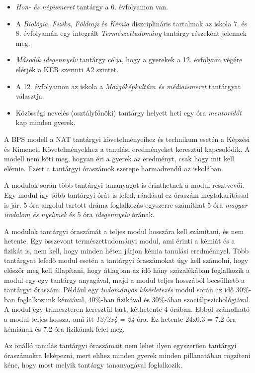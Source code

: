\begin{itemize}
\tightlist
\item
  \emph{Hon- és népismeret} tantárgy a 6. évfolyamon van.
\item
  A \emph{Biológia}, \emph{Fizika}, \emph{Földrajz} és \emph{Kémia}
  diszciplináris tartalmak az iskola 7. és 8. évfolyamán egy integrált
  \emph{Természettudomány} tantárgy részeként jelennek meg.
\item
  \emph{Második idegennyelv} tantárgy célja, hogy a gyerekek a 12.
  évfolyam végére elérjék a KER szerinti A2 szintet.
\item
  A 12. évfolyamon az iskola a \emph{Mozgóképkultúra és médiaismeret}
  tantárgyat választja.
\item
  Közösségi nevelés (osztályfőnöki) tantárgy helyett heti egy óra
  \emph{mentoridőt} kap minden gyerek.
\end{itemize}

A BPS modell a NAT tantárgyi követelményeihez és technikum esetén a
Képzési és Kimeneti Követelményekhez a tanulási eredményeket keresztül
kapcsolódik. A modell nem köti meg, hogyan éri a gyerek az eredményt,
csak hogy mit kell elérnie. Ezért a tantárgyi óraszámok szerepe
harmadrendű az iskolában.

A modulok során több tantárgyi tananyagot is érinthetnek a modul
résztvevői. Egy modul így több tantárgyi órát is lefed, ráadásul ez
óraszám megtakarítással is jár. 5 óra angolul tartott dráma foglalkozás
egyszerre számíthat 5 óra \emph{magyar irodalom és nyelvnek} és 5 óra
\emph{idegennyelv} órának.

A modulok tantárgyi óraszámát a teljes modul hosszára kell számítani, és
nem hetente. Egy összevont természettudományi modul, ami érinti a kémiát
és a fizikát is, nem kell, hogy minden héten járjon kémia tanulási
eredménnyel. Több tantárgyat lefedő modul esetén a tantárgyi óraszámokat
úgy kell számolni, hogy először meg kell állapítani, hogy átlagban az
idő hány százalékában foglalkozik a modul egy-egy tantárgy anyagával,
majd a modul teljes hosszából becsülhető a tantárgyi óraszám. Például
egy \emph{tudományos kísérletezés} modul során az idő 30\%-ban
foglalkozunk kémiával, 40\%-ban fizikával és 30\%-ában
szociálpszichológiával. A modul egy trimeszteren keresztül tart,
kéthetente 4 órában. Ebből számolható a modul teljes hossza, ami itt
\emph{12/2x4 = 24} óra. Ez hetente 24x0.3 = 7.2 óra kémiának és 7.2 óra
fizikának felel meg.

Az önálló tanulás tantárgyi óraszámait nem lehet ilyen egyszerűen
tantárgyi óraszámokra leképezni, mert ehhez minden gyerek minden
pillanatában rögzíteni kéne, hogy most melyik tantárgy tananyagával
foglalkozik.

